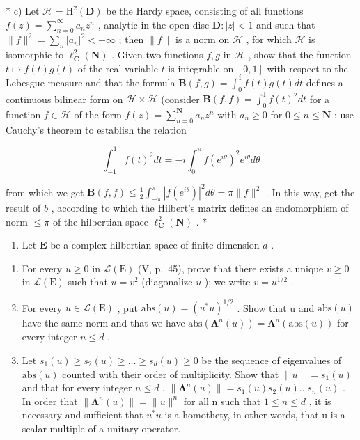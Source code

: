 \begin{enumerate}
* c) Let \(\mathcal{H} = \mathrm{H}^2 (\mathbf{D})\) be the Hardy space, consisting of all functions \(f(z) = \sum_{n=0}^{\infty} a_n z^n\) , analytic in the open disc \(\mathbf{D}:|z| < 1\) and such that \(\| f\|^2 = \sum_n |a_n|^2 < +\infty\) ; then \(\| f\|\) is a norm on \(\mathcal{H}\) , for which \(\mathcal{H}\) is isomorphic to \(\ell_{\mathbf{C}}^2 (\mathbf{N})\) . Given two functions \(f, g\) in \(\mathcal{H}\) , show that the function \(t \mapsto f(t) g(t)\) of the real variable \(t\) is integrable on \([0,1]\) with respect to the Lebesgue measure and that the formula \(\mathbf{B}(f,g) = \int_0^1 f(t) g(t) dt\) defines a continuous bilinear form on \(\mathcal{H} \times \mathcal{H}\) (consider \(\mathbf{B}(f,f) = \int_0^1 f(t)^2 dt\) for a function \(f \in \mathcal{H}\) of the form \(f(z) = \sum_{n=0}^{\mathbf{N}} a_n z^n\) with \(a_n \geqslant 0\) for \(0 \leqslant n \leqslant \mathbf{N}\) ; use Cauchy's theorem to establish the relation

\[
\int_ {- 1} ^ {1} f (t) ^ {2} d t = - i \int_ {0} ^ {\pi} f (e ^ {i \theta}) ^ {2} e ^ {i \theta} d \theta
\]

from which we get \(\mathbf{B}(f, f) \leqslant \frac{1}{2} \int_{-\pi}^{\pi} |f(e^{i\theta})|^2 d\theta = \pi \| f\|^2\) . In this way, get the result of \(b\) , according to which the Hilbert's matrix defines an endomorphism of norm \(\leqslant \pi\) of the hilbertian space \(\ell_{\mathbf{C}}^2(\mathbf{N})\) . *

\begin{enumerate}
\def\labelenumi{\arabic{enumi})}
\setcounter{enumi}{3}
\tightlist
\item
  Let \(\mathbf{E}\) be a complex hilbertian space of finite dimension \(d\) .
\end{enumerate}

\begin{enumerate}
\def\labelenumi{\alph{enumi})}
\item
  For every \(u \geqslant 0\) in \(\mathcal{L}(\mathrm{E})\) (V, p.~45), prove that there exists a unique \(v \geqslant 0\) in \(\mathcal{L}(\mathrm{E})\) such that \(u = v^2\) (diagonalize \(u\) ); we write \(v = u^{1/2}\) .
\item
  For every \(u \in \mathcal{L}(\mathrm{E})\) , put \(\mathrm{abs}(u) = (u^{*}u)^{1/2}\) . Show that u and \(\mathrm{abs}(u)\) have the same norm and that we have \(\mathrm{abs}(\symbf{\Lambda}^{n}(u)) = \symbf{\Lambda}^{n}(\mathrm{abs}(u))\) for every integer \(n \leqslant d\) .
\item
  Let \(s_{1}(u) \geqslant s_{2}(u) \geqslant \ldots \geqslant s_{d}(u) \geqslant 0\) be the sequence of eigenvalues of \(\mathrm{abs}(u)\) counted with their order of multiplicity. Show that \(\|u\| = s_{1}(u)\) and that for every integer \(n \leqslant d\) , \(\| \symbf{\Lambda}^{n}(u)\| = s_{1}(u) s_{2}(u) \ldots s_{n}(u)\) . In order that \(\| \symbf{\Lambda}^{n}(u)\| = \| u\|^{n}\) for all n such that \(1 \leqslant n \leqslant d\) , it is necessary and sufficient that \(u^{*}u\) is a homothety, in other words, that u is a scalar multiple of a unitary operator.
\end{enumerate}


\end{enumerate}
